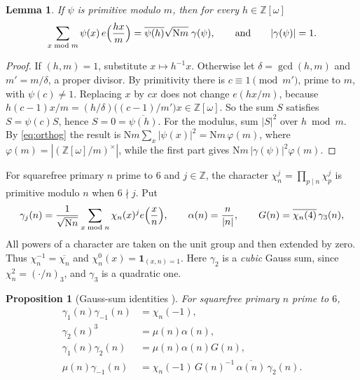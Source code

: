 \documentclass[11pt]{article}
\numberwithin{equation}{section}
\newcommand{\N}{\mathrm N}
\newcommand{\OO}{\mathbb Z[\omega]}
\newcommand{\Z}{\mathbb Z}
\newtheorem{proposition}[theorem]{Proposition}
\newtheorem{lemma}[theorem]{Lemma}
\theoremstyle{definition}
\theoremstyle{remark}
\begin{document}
\begin{lemma}\label{lem:primgauss}
If $\psi$ is primitive modulo $m$, then for every $h\in\OO$
\begin{equation}\label{eq:primgauss}
 \sum_{x\bmod m}\psi(x)\,e\Bigl(\frac{hx}m\Bigr)=\overline{\psi(h)}\sqrt{\N m}\;\gamma(\psi),
 \qquad\text{and}\qquad|\gamma(\psi)|=1 .
\end{equation}
\end{lemma}

\begin{proof}
If $(h,m)=1$, substitute $x\mapsto h^{-1}x$. Otherwise let $\delta=\gcd(h,m)$ and $m'=m/\delta$, a proper
divisor. By primitivity there is $c\equiv1\pmod{m'}$, prime to $m$, with $\psi(c)\ne1$. Replacing $x$ by $cx$
does not change $e(hx/m)$, because $h(c-1)x/m=(h/\delta)\bigl((c-1)/m'\bigr)x\in\OO$. So the sum $S$
satisfies $S=\psi(c)S$, hence $S=0=\overline{\psi(h)}$. For the modulus, sum $|S|^2$ over $h\bmod m$. By
\eqref{eq:orthog} the result is $\N m\sum_x|\psi(x)|^2=\N m\,\varphi(m)$, where $\varphi(m)=|(\OO/m)^\times|$, while
the first part gives $\N m\,|\gamma(\psi)|^2\varphi(m)$.
\end{proof}

For squarefree primary $n$ prime to $6$ and $j\in\Z$, the character $\chi_n^j=\prod_{p\mid n}\chi_p^j$ is primitive
modulo $n$ when $6\nmid j$. Put
\begin{equation}\label{eq:gammaj}
 \gamma_j(n)=\frac1{\sqrt{\N n}}\sum_{x\bmod n}\chi_n(x)^je\Bigl(\frac xn\Bigr),\qquad
 \alpha(n)=\frac n{|n|},\qquad
 G(n)=\overline{\chi_n(4)}\,\gamma_3(n),
\end{equation}
All powers of a character are taken on the unit group and then extended by zero. Thus
$\chi_n^{-1}=\overline{\chi_n}$ and $\chi_n^0(x)=\mathbf 1_{(x,n)=1}$.
Here $\gamma_2$ is a \emph{cubic} Gauss sum, since $\chi_n^2=(\cdot/n)_3$, and $\gamma_3$ is a quadratic one.

\begin{proposition}[Gauss-sum identities {\cite[Lemma~4.1]{QRH}}]\label{prop:gaussids}
For squarefree primary $n$ prime to $6$,
\begin{align}
 \gamma_1(n)\gamma_{-1}(n)&=\chi_n(-1),\label{eq:g1gm1}\\
 \gamma_2(n)^3&=\mu(n)\alpha(n),\label{eq:g2cube}\\
 \gamma_1(n)\gamma_2(n)&=\mu(n)\alpha(n)G(n),\label{eq:g1g2}\\
 \mu(n)\gamma_{-1}(n)&=\chi_n(-1)\,G(n)^{-1}\,\overline{\alpha(n)}\,\gamma_2(n).\label{eq:mobiusgauss}
\end{align}
\end{proposition}
\end{document}
